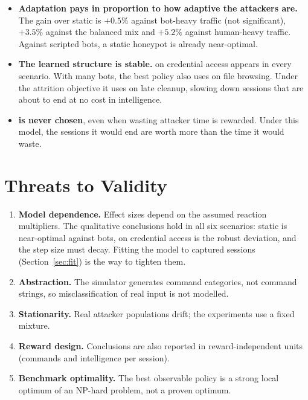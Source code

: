 \begin{itemize}
  \item \textbf{Adaptation pays in proportion to how adaptive the attackers are.} The gain over
    static is $+0.5\%$ against bot-heavy traffic (not significant), $+3.5\%$ against the balanced
    mix and $+5.2\%$ against human-heavy traffic. Against scripted bots, a static honeypot is
    already near-optimal.
  \item \textbf{The learned structure is stable.}  on credential access appears in every
    scenario. With many bots, the best policy also uses  on file browsing. Under the
    attrition objective it uses  on late cleanup, slowing down sessions that are
    about to end at no cost in intelligence.
  \item \textbf{ is never chosen}, even when wasting attacker time is rewarded. Under
    this model, the sessions it would end are worth more than the time it would waste.
\end{itemize}

\section{Threats to Validity}

\begin{enumerate}
  \item \textbf{Model dependence.} Effect sizes depend on the assumed reaction multipliers. The
    qualitative conclusions hold in all six scenarios: static is near-optimal against bots,
     on credential access is the robust deviation, and the step size must decay.
    Fitting the model to captured sessions (Section~\ref{sec:fit}) is the way to tighten them.
  \item \textbf{Abstraction.} The simulator generates command categories, not command strings,
    so misclassification of real input is not modelled.
  \item \textbf{Stationarity.} Real attacker populations drift; the experiments use a fixed mixture.
  \item \textbf{Reward design.} Conclusions are also reported in reward-independent units
    (commands and intelligence per session).
  \item \textbf{Benchmark optimality.} The best observable policy is a strong local optimum of an
    NP-hard problem, not a proven optimum.
\end{enumerate}
